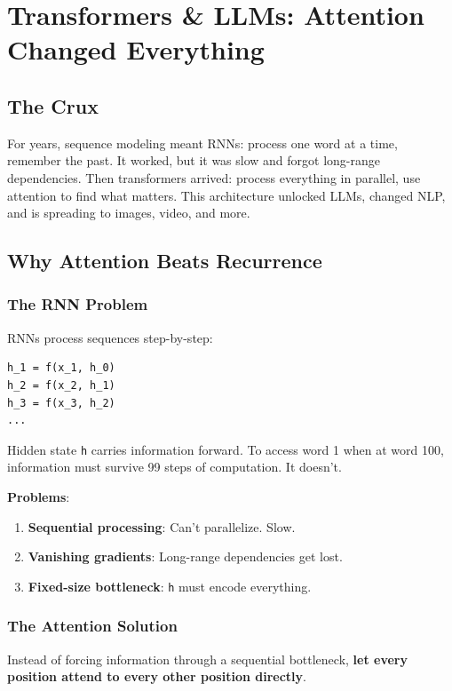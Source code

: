 \chapter{Transformers \& LLMs: Attention Changed Everything}

\section{The Crux}
For years, sequence modeling meant RNNs: process one word at a time, remember the past. It worked, but it was slow and forgot long-range dependencies. Then transformers arrived: process everything in parallel, use attention to find what matters. This architecture unlocked LLMs, changed NLP, and is spreading to images, video, and more.

\section{Why Attention Beats Recurrence}

\subsection{The RNN Problem}

RNNs process sequences step-by-step:
\begin{verbatim}
h_1 = f(x_1, h_0)
h_2 = f(x_2, h_1)
h_3 = f(x_3, h_2)
...
\end{verbatim}

Hidden state \texttt{h} carries information forward. To access word 1 when at word 100, information must survive 99 steps of computation. It doesn't.

\textbf{Problems}:
\begin{enumerate}
\item \textbf{Sequential processing}: Can't parallelize. Slow.
\item \textbf{Vanishing gradients}: Long-range dependencies get lost.
\item \textbf{Fixed-size bottleneck}: \texttt{h} must encode everything.
\end{enumerate}

\subsection{The Attention Solution}

Instead of forcing information through a sequential bottleneck, \textbf{let every position attend to every other position directly}.

